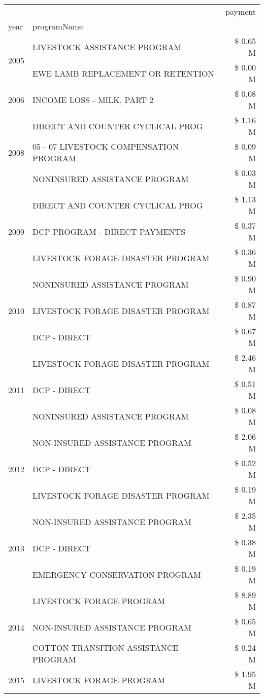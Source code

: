 \begin{tabular}{llr}
\toprule
 &  & payment \\
year & programName &  \\
\midrule
\multirow[t]{2}{*}{2005} & LIVESTOCK ASSISTANCE PROGRAM & \$ 0.65 M \\
 & EWE LAMB REPLACEMENT OR RETENTION & \$ 0.00 M \\
\cline{1-3}
2006 & INCOME LOSS - MILK, PART 2 & \$ 0.08 M \\
\cline{1-3}
\multirow[t]{3}{*}{2008} & DIRECT AND COUNTER CYCLICAL PROG & \$ 1.16 M \\
 & 05 - 07 LIVESTOCK COMPENSATION PROGRAM & \$ 0.09 M \\
 & NONINSURED ASSISTANCE PROGRAM & \$ 0.03 M \\
\cline{1-3}
\multirow[t]{3}{*}{2009} & DIRECT AND COUNTER CYCLICAL PROG & \$ 1.13 M \\
 & DCP PROGRAM - DIRECT PAYMENTS & \$ 0.37 M \\
 & LIVESTOCK FORAGE DISASTER  PROGRAM & \$ 0.36 M \\
\cline{1-3}
\multirow[t]{3}{*}{2010} & NONINSURED ASSISTANCE PROGRAM & \$ 0.90 M \\
 & LIVESTOCK FORAGE DISASTER PROGRAM & \$ 0.87 M \\
 & DCP - DIRECT & \$ 0.67 M \\
\cline{1-3}
\multirow[t]{3}{*}{2011} & LIVESTOCK FORAGE DISASTER PROGRAM & \$ 2.46 M \\
 & DCP - DIRECT & \$ 0.51 M \\
 & NONINSURED ASSISTANCE PROGRAM & \$ 0.08 M \\
\cline{1-3}
\multirow[t]{3}{*}{2012} & NON-INSURED ASSISTANCE PROGRAM & \$ 2.06 M \\
 & DCP - DIRECT & \$ 0.52 M \\
 & LIVESTOCK FORAGE DISASTER PROGRAM & \$ 0.19 M \\
\cline{1-3}
\multirow[t]{3}{*}{2013} & NON-INSURED ASSISTANCE PROGRAM & \$ 2.35 M \\
 & DCP - DIRECT & \$ 0.38 M \\
 & EMERGENCY CONSERVATION PROGRAM & \$ 0.19 M \\
\cline{1-3}
\multirow[t]{3}{*}{2014} & LIVESTOCK FORAGE PROGRAM & \$ 8.89 M \\
 & NON-INSURED ASSISTANCE PROGRAM & \$ 0.65 M \\
 & COTTON TRANSITION ASSISTANCE PROGRAM & \$ 0.24 M \\
\cline{1-3}
\multirow[t]{3}{*}{2015} & LIVESTOCK FORAGE PROGRAM & \$ 1.95 M \\

\end{tabular}
